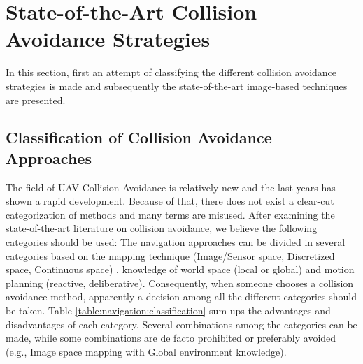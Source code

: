 
\section{State-of-the-Art Collision Avoidance Strategies}

In this section, first an attempt of classifying the different collision avoidance strategies is made and subsequently the state-of-the-art image-based techniques are presented.

\subsection{Classification of Collision Avoidance Approaches}
\label{ch:literature:obstacle_avoidance:navigation:classification}

The field of \ac{UAV} Collision Avoidance is relatively new and the last years has shown a rapid development. Because of that, there does not exist a clear-cut categorization of methods and many terms are misused. After examining the state-of-the-art literature on collision avoidance, we believe the following categories should be used: The navigation approaches can be divided in several categories based on the mapping technique (Image/Sensor space, Discretized space, Continuous space) \cite{Dijk}, knowledge of world space (local or global) and motion planning (reactive, deliberative). Consequently, when someone chooses a collision avoidance method, apparently a decision among all the different categories should be taken. Table \ref{table:navigation:classification} sum ups the advantages and disadvantages of each category. Several combinations among the categories can be made, while some combinations are de facto prohibited or preferably avoided (e.g., Image space mapping with Global environment knowledge).

